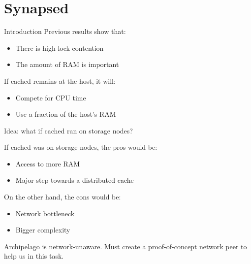 \section{Synapsed}

\begin{frame}{Introduction}
	Previous results show that:
	\begin{itemize}
		\item There is high lock contention
		\item The amount of RAM is important
	\end{itemize}
	\dspc
	If cached remains at the host, it will:
	\begin{itemize}
		\item Compete for CPU time
		\item Use a fraction of the host's RAM
	\end{itemize}
	\dspc
	Idea: what if cached ran on storage nodes?
\end{frame}

\begin{frame}
	If cached was on storage nodes, the pros would be:
	\begin{itemize}
		\item Access to more RAM
		\item Major step towards a distributed cache
	\end{itemize}
	\dspc
	On the other hand, the cons would be:
	\begin{itemize}
		\item Network bottleneck
		\item Bigger complexity
	\end{itemize}
	\dspc
	Archipelago is network-unaware. Must create a proof-of-concept network peer 
	to help us in this task.
\end{frame}

